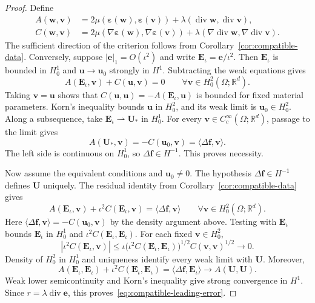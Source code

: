 \documentclass[10pt]{amsart}
\renewcommand{\div}{\operatorname{div}}
\numberwithin{equation}{section}
\begin{document}
\begin{proof}
Define
\begin{align*}
A(\boldsymbol w,\boldsymbol v)&=2\mu(\boldsymbol\varepsilon(\boldsymbol w),\boldsymbol\varepsilon(\boldsymbol v))+\lambda(\div\boldsymbol w,\div\boldsymbol v),\\
C(\boldsymbol w,\boldsymbol v)&=2\mu(\nabla\boldsymbol\varepsilon(\boldsymbol w),\nabla\boldsymbol\varepsilon(\boldsymbol v))+\lambda(\nabla\div\boldsymbol w,\nabla\div\boldsymbol v).
\end{align*}
The sufficient direction of the criterion follows from Corollary~\ref{cor:compatible-data}. Conversely, suppose $|\boldsymbol e|_1=O(\iota^2)$ and write $\boldsymbol E_\iota=\boldsymbol e/\iota^2$. Then $\boldsymbol E_\iota$ is bounded in $H_0^1$ and $\boldsymbol u\to\boldsymbol u_0$ strongly in $H^1$. Subtracting the weak equations gives
\[
A(\boldsymbol E_\iota,\boldsymbol v)+C(\boldsymbol u,\boldsymbol v)=0
\qquad\forall\boldsymbol v\in H_0^2(\Omega;\mathbb R^d).
\]
Taking $\boldsymbol v=\boldsymbol u$ shows that $C(\boldsymbol u,\boldsymbol u)=-A(\boldsymbol E_\iota,\boldsymbol u)$ is bounded for fixed material parameters. Korn's inequality bounds $\boldsymbol u$ in $H_0^2$, and its weak limit is $\boldsymbol u_0\in H_0^2$. Along a subsequence, take $\boldsymbol E_\iota\rightharpoonup\boldsymbol U_\ast$ in $H_0^1$. For every $\boldsymbol v\in C_c^\infty(\Omega;\mathbb R^d)$, passage to the limit gives
\[
A(\boldsymbol U_\ast,\boldsymbol v)=-C(\boldsymbol u_0,\boldsymbol v)
=\langle\Delta\boldsymbol f,\boldsymbol v\rangle.
\]
The left side is continuous on $H_0^1$, so $\Delta\boldsymbol f\in H^{-1}$. This proves necessity.

Now assume the equivalent conditions and $\boldsymbol u_0\neq0$. The hypothesis $\Delta\boldsymbol f\in H^{-1}$ defines $\boldsymbol U$ uniquely. The residual identity from Corollary~\ref{cor:compatible-data} gives
\[
A(\boldsymbol E_\iota,\boldsymbol v)+\iota^2C(\boldsymbol E_\iota,\boldsymbol v)
=\langle\Delta\boldsymbol f,\boldsymbol v\rangle
\qquad\forall\boldsymbol v\in H_0^2(\Omega;\mathbb R^d).
\]
Here $\langle\Delta\boldsymbol f,\boldsymbol v\rangle=-C(\boldsymbol u_0,\boldsymbol v)$ by the density argument above. Testing with $\boldsymbol E_\iota$ bounds $\boldsymbol E_\iota$ in $H_0^1$ and $\iota^2C(\boldsymbol E_\iota,\boldsymbol E_\iota)$. For each fixed $\boldsymbol v\in H_0^2$,
\[
|\iota^2C(\boldsymbol E_\iota,\boldsymbol v)|
\leq\iota\big(\iota^2C(\boldsymbol E_\iota,\boldsymbol E_\iota)\big)^{1/2}
C(\boldsymbol v,\boldsymbol v)^{1/2}\longrightarrow0.
\]
Density of $H_0^2$ in $H_0^1$ and uniqueness identify every weak limit with $\boldsymbol U$. Moreover,
\[
A(\boldsymbol E_\iota,\boldsymbol E_\iota)+\iota^2C(\boldsymbol E_\iota,\boldsymbol E_\iota)
=\langle\Delta\boldsymbol f,\boldsymbol E_\iota\rangle
\longrightarrow A(\boldsymbol U,\boldsymbol U).
\]
Weak lower semicontinuity and Korn's inequality give strong convergence in $H^1$. Since $r=\lambda\div\boldsymbol e$, this proves~\eqref{eq:compatible-leading-error}.


\end{proof}
\end{document}
